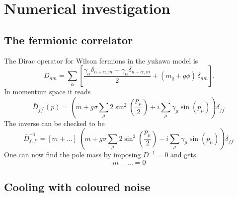 \chapter{Numerical investigation}
\label{chapt:results}


\section{The fermionic correlator}

The Dirac operator for Wilson fermions in the yukawa model is
\begin{equation*}
D_{n m}=\sum_\alpha\left[\frac{\gamma_\alpha \delta_{n+\alpha, m} - \gamma_\alpha \delta_{n-\alpha, m}}{2} + (m_q + g \phi) \, \delta_{n m}\right] .
\end{equation*}
In momentum space it reads
\begin{equation*}
\bar{D}_{f f^{\prime}}(p)=\left(m+ g \sigma \sum_\mu 2 \sin ^2\left(\frac{p_\mu}{2}\right)+i \sum_\mu \gamma_\mu \sin \left(p_\mu\right)\right) \delta_{f f^{\prime}}
\end{equation*}
The inverse can be checked to be 
\begin{equation*}
    \bar D_{f,f'} ^{-1} = \left[m + \dots\right] \ \left(m+ g \sigma \sum_\mu 2 \sin ^2\left(\frac{p_\mu}{2}\right) - i \sum_\mu \gamma_\mu \sin \left(p_\mu\right)\right) \delta_{f f^{\prime}}
\end{equation*}
One can now find the pole mass by imposing $D^{-1} = 0$ and gets 
\begin{equation*}
    m + \dots = 0
\end{equation*}

\section{Cooling with coloured noise}


